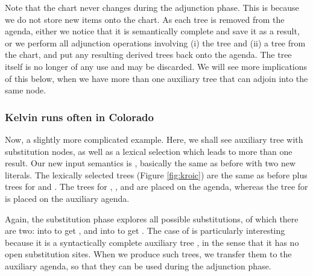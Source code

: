 Note that the chart never changes during the adjunction phase.  This
is because we do not store new items onto the chart.  As each tree is
removed from the agenda, either we notice that it is semantically
complete and save it as a result, or we perform all adjunction
operations involving (i) the tree and (ii) a tree from the chart, and
put any resulting derived trees back onto the agenda.  The tree itself
is no longer of any use and may be discarded.  We will see more
implications of this below, when we have more than one auxiliary tree
that can adjoin into the same node.

\subsubsection{Kelvin runs often in Colorado}
Now, a slightly more complicated example.  Here, we shall see auxiliary
tree with substitution nodes, as well as a lexical selection which leads
to more than one result.  Our new input semantics
is , basically the same as before with two new literals.
The lexically selected trees (Figure \ref{fig:kroic}) are the same as
before plus trees for  and .
The trees for , ,
 and  are placed on the agenda,
whereas the tree for  is placed on the auxiliary
agenda.


Again, the substitution phase explores all possible substitutions, of
which there are two:  into  to
get , and  into
 to get .  The case of
 is particularly interesting because it is a
syntactically complete auxiliary tree
, in the sense that it has no open
substitution sites.  When we produce such trees, we transfer them to the
auxiliary agenda, so that they can be used during the adjunction phase.

